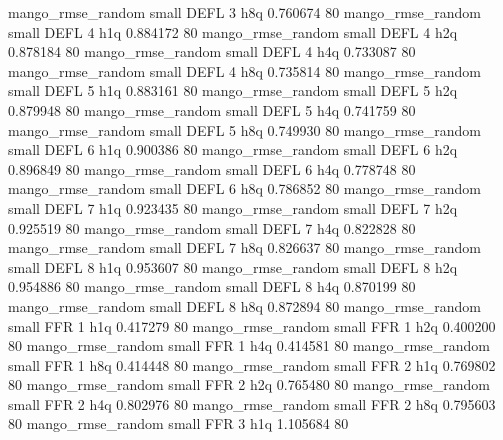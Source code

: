 mango_rmse_random      small     DEFL                 3                  h8q 0.760674 80
mango_rmse_random      small     DEFL                 4                  h1q 0.884172 80
mango_rmse_random      small     DEFL                 4                  h2q 0.878184 80
mango_rmse_random      small     DEFL                 4                  h4q 0.733087 80
mango_rmse_random      small     DEFL                 4                  h8q 0.735814 80
mango_rmse_random      small     DEFL                 5                  h1q 0.883161 80
mango_rmse_random      small     DEFL                 5                  h2q 0.879948 80
mango_rmse_random      small     DEFL                 5                  h4q 0.741759 80
mango_rmse_random      small     DEFL                 5                  h8q 0.749930 80
mango_rmse_random      small     DEFL                 6                  h1q 0.900386 80
mango_rmse_random      small     DEFL                 6                  h2q 0.896849 80
mango_rmse_random      small     DEFL                 6                  h4q 0.778748 80
mango_rmse_random      small     DEFL                 6                  h8q 0.786852 80
mango_rmse_random      small     DEFL                 7                  h1q 0.923435 80
mango_rmse_random      small     DEFL                 7                  h2q 0.925519 80
mango_rmse_random      small     DEFL                 7                  h4q 0.822828 80
mango_rmse_random      small     DEFL                 7                  h8q 0.826637 80
mango_rmse_random      small     DEFL                 8                  h1q 0.953607 80
mango_rmse_random      small     DEFL                 8                  h2q 0.954886 80
mango_rmse_random      small     DEFL                 8                  h4q 0.870199 80
mango_rmse_random      small     DEFL                 8                  h8q 0.872894 80
mango_rmse_random      small      FFR                 1                  h1q 0.417279 80
mango_rmse_random      small      FFR                 1                  h2q 0.400200 80
mango_rmse_random      small      FFR                 1                  h4q 0.414581 80
mango_rmse_random      small      FFR                 1                  h8q 0.414448 80
mango_rmse_random      small      FFR                 2                  h1q 0.769802 80
mango_rmse_random      small      FFR                 2                  h2q 0.765480 80
mango_rmse_random      small      FFR                 2                  h4q 0.802976 80
mango_rmse_random      small      FFR                 2                  h8q 0.795603 80
mango_rmse_random      small      FFR                 3                  h1q 1.105684 80
